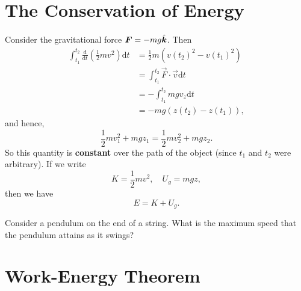 \documentclass[../classical_mechanics.tex]{subfiles}
\begin{document}
    \section{The Conservation of Energy}

        \paragraph{}
        Consider the gravitational force $\boldsymbol{F}=-mg\hat{\boldsymbol{k}}$. Then
        \begin{align}
            \int_{t_1}^{t_2}\frac{\mathrm{d}}{\mathrm{d}t}\left(\frac{1}{2}mv^2\right)\mathrm{d}t&=\frac{1}{2}m(v(t_2)^2-v(t_1)^2)\\
            &=\int_{t_1}^{t_2}\vec{F}\cdot\vec{v}\mathrm{d}t\\
            &=-\int_{t_1}^{t_2}mgv_z\mathrm{d}t\\
            &=-mg(z(t_2)-z(t_1)),
        \end{align}
        and hence,
        \begin{equation}
            \frac{1}{2}mv_1^2+mgz_1=\frac{1}{2}mv_2^2+mgz_2.
        \end{equation}
        So this quantity is \textbf{constant} over the path of the object (since $t_1$ and $t_2$ were arbitrary).
        If we write
        \begin{equation}
            K=\frac{1}{2}mv^2, \quad U_g=mgz,
        \end{equation}
        then we have
        \begin{equation}
            E=K+U_g.
        \end{equation}
        \begin{example}
            Consider a pendulum on the end of a string. What is the maximum speed that the pendulum attains as it swings?
        \end{example}

    \section{Work-Energy Theorem}
\end{document}
